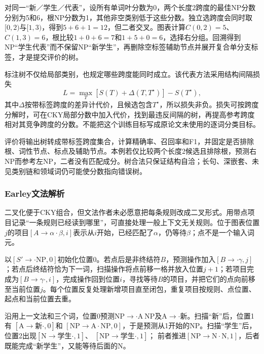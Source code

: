 对同一“新／学生／代表”，设所有单词叶分数为0，两个长度2跨度的最佳NP分数分别为5和6，根NP分数为1，其他非空类别低于这些分数。独立选跨度会同时取$[0,2)$与$[1,3)$，得到$5+6+1=12$，但二者交叉。图表计算$C(0,2)=5$、$C(1,3)=6$，根比较$1+0+6=7$和$1+5+0=6$，选择右分组。回溯得到NP“学生代表”而不保留NP“新学生”，再删除空标签辅助节点并展开复合单分支标签，才是提交评价的树。

标注树不仅给局部类别，也规定哪些跨度能同时成立。该代表方法采用结构间隔损失
\begin{equation}
 L=\max_T[S(T)+\Delta(T,T^\star)]-S(T^\star),
 \label{eq:nlp-analysis-parse-hinge}
\end{equation}
其中$\Delta$按带标签跨度的差异计代价，且候选包含$T^\star$，所以损失非负。损失可按跨度分解时，可在CKY局部分数中加入代价，找到最违反间隔的树，再提高参考跨度相对其竞争跨度的分数。不能把这个训练目标写成原论文未使用的逐词分类目标。

评价将输出树转成带标签跨度集合，计算精确率、召回率和F1，并固定是否排除根、词性节点、标点及辅助节点。本例若仅比较两个长度2候选且排除根，预测右NP而参考左NP，二者没有匹配成分。树合法只保证结构自洽；长句、深嵌套、未见类别链和领域词仍可能使分数指向错误树。

\subsubsection{Earley文法解析}
\label{sec:nlp-analysis-earley}

二叉化便于CKY组合，但文法作者未必愿意把每条规则改成二叉形式。用带点项目记录“一条规则已经读到哪里”，可直接处理一般上下文无关规则。位于图表位置$j$的项目$[A\to\alpha\mathbin{\cdot}\beta,i]$表示从$i$开始，已经匹配了$\alpha$，仍等待$\beta$；点不是一个输入词元。

以$[S'\to\mathbin{\cdot}\mathrm{NP},0]$初始化位置0。若点后是非终结符$B$，预测操作加入$[B\to\mathbin{\cdot}\gamma,j]$；若点后终结符恰为下一词，扫描操作将点前移一格并放入位置$j+1$；若项目完成为$[B\to\gamma\mathbin{\cdot},i]$，完成操作回到位置$i$，寻找等待$B$的项目，并把它们的点向前移至当前位置$j$。每个位置反复处理新增项目直至闭包，重复项目按规则、点位置、起点和当前位置去重。

沿用上一文法和三个词，位置0预测$\mathrm{NP}\to\mathbin{\cdot}\mathrm A\ \mathrm{NP}$及$\mathrm A\to\mathbin{\cdot}\text{新}$。扫描“新”后，位置1有
$[\mathrm A\to\text{新}\mathbin{\cdot},0]$和
$[\mathrm{NP}\to\mathrm A\mathbin{\cdot}\mathrm{NP},0]$，于是预测从1开始的NP。扫描“学生”后，位置2出现$[\mathrm N\to\text{学生}\mathbin{\cdot},1]$、
$[\mathrm{NP}\to\text{学生}\mathbin{\cdot},1]$；
前者推进$[\mathrm{NP}\to\mathrm N\mathbin{\cdot}\mathrm N,1]$，后者既能完成“新学生”，又能等待后面的N。

